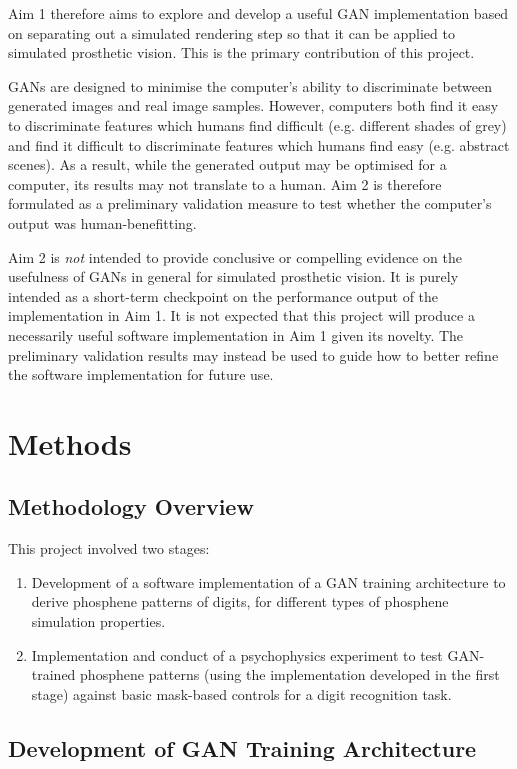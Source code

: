 \documentclass[a4paper,11pt,openany]{book}
\begin{document}
Aim 1 therefore aims to explore and develop a useful GAN implementation based on separating out a simulated rendering step so that it can be applied to simulated prosthetic vision.
This is the primary contribution of this project.

GANs are designed to minimise the computer's ability to discriminate between generated images and real image samples.
However, computers both find it easy to discriminate features which humans find difficult (e.g. different shades of grey) and find it difficult to discriminate features which humans find easy (e.g. abstract scenes).
As a result, while the generated output may be optimised for a computer, its results may not translate to a human.
Aim 2 is therefore formulated as a preliminary validation measure to test whether the computer's output was human-benefitting.

Aim 2 is \emph{not} intended to provide conclusive or compelling evidence on the usefulness of GANs in general for simulated prosthetic vision.
It is purely intended as a short-term checkpoint on the performance output of the implementation in Aim 1.
It is not expected that this project will produce a necessarily useful software implementation in Aim 1 given its novelty.
The preliminary validation results may instead be used to guide how to better refine the software implementation for future use.

\part{Methods}
\label{sec:org3763a62}
\chapter*{Methodology Overview}
\label{sec:org1f415d4}
This project involved two stages:

\begin{enumerate}
\item Development of a software implementation of a GAN training architecture to derive phosphene patterns of digits, for different types of phosphene simulation properties.
\item Implementation and conduct of a psychophysics experiment to test GAN-trained phosphene patterns (using the implementation developed in the first stage) against basic mask-based controls for a digit recognition task.
\end{enumerate}

\chapter{Development of GAN Training Architecture}
\label{sec:org5a2925c}
\end{document}
